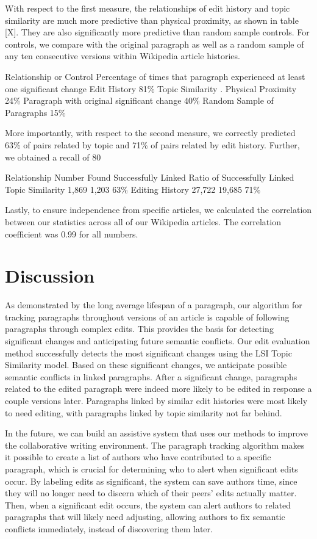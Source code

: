With respect to the first measure, the relationships of edit history and
topic similarity are much more predictive than physical proximity, as
shown in table {[}X{]}. They are also significantly more predictive than
random sample controls. For controls, we compare with the original
paragraph as well as a random sample of any ten consecutive versions
within Wikipedia article histories.

Relationship or Control Percentage of times that paragraph experienced
at least one significant change Edit History 81\% Topic Similarity .
Physical Proximity 24\% Paragraph with original significant change 40\%
Random Sample of Paragraphs 15\%

More importantly, with respect to the second measure, we correctly
predicted 63\% of pairs related by topic and 71\% of pairs related by
edit history. Further, we obtained a recall of 80

Relationship Number Found Successfully Linked Ratio of Successfully
Linked Topic Similarity 1,869 1,203 63\% Editing History 27,722 19,685
71\%

Lastly, to ensure independence from specific articles, we calculated the
correlation between our statistics across all of our Wikipedia articles.
The correlation coefficient was 0.99 for all numbers.

\section{Discussion}\label{discussion}

As demonstrated by the long average lifespan of a paragraph, our
algorithm for tracking paragraphs throughout versions of an article is
capable of following paragraphs through complex edits. This provides the
basis for detecting significant changes and anticipating future semantic
conflicts. Our edit evaluation method successfully detects the most
significant changes using the LSI Topic Similarity model. Based on these
significant changes, we anticipate possible semantic conflicts in linked
paragraphs. After a significant change, paragraphs related to the edited
paragraph were indeed more likely to be edited in response a couple
versions later. Paragraphs linked by similar edit histories were most
likely to need editing, with paragraphs linked by topic similarity not
far behind.

In the future, we can build an assistive system that uses our methods to
improve the collaborative writing environment. The paragraph tracking
algorithm makes it possible to create a list of authors who have
contributed to a specific paragraph, which is crucial for determining
who to alert when significant edits occur. By labeling edits as
significant, the system can save authors time, since they will no longer
need to discern which of their peers' edits actually matter. Then, when
a significant edit occurs, the system can alert authors to related
paragraphs that will likely need adjusting, allowing authors to fix
semantic conflicts immediately, instead of discovering them later.

